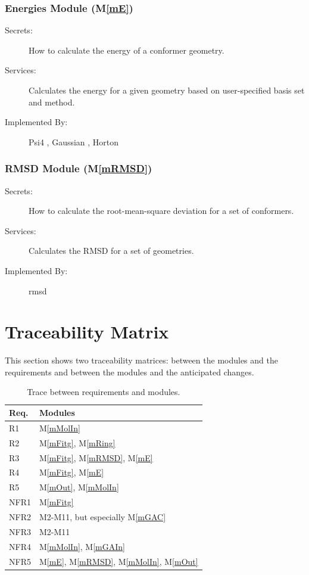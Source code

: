 \documentclass[12pt, titlepage]{article}
\newcommand{\mref}[1]{M\ref{#1}}
\begin{document}
\subsubsection{Energies Module (\mref{mE})}
\begin{description}
	\item[Secrets:] How to calculate the energy of a conformer geometry.
	\item[Services:] Calculates the energy for a given geometry based on 
	user-specified basis set and method. 
	\item[Implemented By:] Psi4 \citet{psi4}, Gaussian \citet{g16}, 
	Horton \citet{horton}
\end{description}

\subsubsection{RMSD Module (\mref{mRMSD})}
\begin{description}
	\item[Secrets:] How to calculate the root-mean-square deviation for a set 
	of conformers.
	\item[Services:] Calculates the RMSD for a set of geometries.
	\item[Implemented By:] rmsd\citet{rmsd-charnley}
\end{description}


\section{Traceability Matrix} \label{SecTM}

This section shows two traceability matrices: between the modules and the
requirements and between the modules and the anticipated changes.

\begin{table}[H]
\centering
\begin{tabular}{p{} p{}}
\toprule
\textbf{Req.} & \textbf{Modules}\\
\midrule
R1 & \mref{mMolIn} \\
R2 & \mref{mFitg}, \mref{mRing} \\
R3 & \mref{mFitg}, \mref{mRMSD}, \mref{mE} \\
R4 & \mref{mFitg}, \mref{mE} \\
R5 & \mref{mOut}, \mref{mMolIn} \\
NFR1 & \mref{mFitg} \\
NFR2 & M2-M11, but especially \mref{mGAC} \\
NFR3 & M2-M11 \\
NFR4 & \mref{mMolIn}, \mref{mGAIn} \\
NFR5 & \mref{mE}, \mref{mRMSD}, \mref{mMolIn}, \mref{mOut} \\
\bottomrule
\end{tabular}
\caption{Trace between requirements and modules.}
\label{TblRT}
\end{table}
\end{document}
